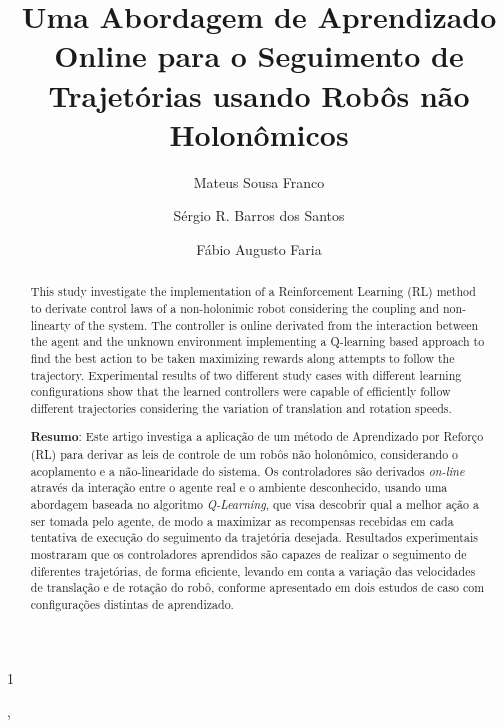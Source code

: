 \documentclass[a4paper]{ifacconf}
\def\portugues{1}
\def\portugues{0}
\begin{document}
	
	
\if\portugues1

% 
	
\begin{frontmatter}

\title{Uma Abordagem de Aprendizado Online para o Seguimento de Trajetórias usando Robôs não Holonômicos} 



\author[First]{Mateus Sousa Franco}, 
\author[First]{Sérgio R. Barros dos Santos}
\author[First]{Fábio Augusto Faria}

\address[First]{Instituto de Ciência e Tecnologia, Universidade Federal de São Paulo, SP, (e-mail: mateus.franco@unifesp.br e sergio.ronaldo@unifesp.br).}


\renewcommand{\abstractname}{{\bf Abstract:~}}
\begin{abstract}                %
This study investigate the implementation of a Reinforcement Learning (RL) method to derivate control laws of a non-holonimic robot considering the coupling and non-linearty of the system. The controller is online derivated from the interaction between the agent and the unknown environment implementing a Q-learning based approach to find the best action to be taken maximizing rewards along attempts to follow the trajectory. Experimental results of two different study cases with different learning configurations show that the learned controllers were capable of efficiently follow different trajectories considering the variation of translation and rotation speeds.  


\vskip 1mm%
{\noindent \bf Resumo}:  
Este artigo investiga a aplicação de um método de Aprendizado por Reforço (RL) para derivar as leis de controle de um robôs não holonômico, considerando o acoplamento e a não-linearidade do sistema. Os controladores são derivados \emph{on-line} através da interação entre o agente real e o ambiente desconhecido, usando uma abordagem baseada no algoritmo \emph{Q-Learning}, que visa descobrir qual a melhor ação a ser tomada pelo agente, de modo a maximizar as recompensas recebidas em cada tentativa de execução do seguimento da trajetória desejada. Resultados experimentais mostraram que os controladores aprendidos são capazes de realizar o seguimento de diferentes trajetórias, de forma eficiente, levando em conta a variação das velocidades de translação e de rotação do robô, conforme apresentado em dois estudos de caso com configurações distintas de aprendizado.



\end{abstract}
\end{frontmatter}
\end{document}

